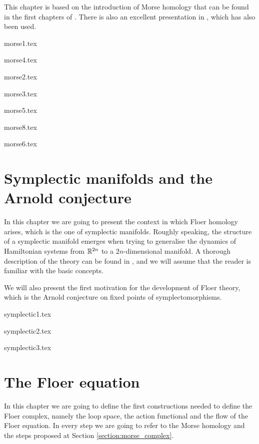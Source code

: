 \documentclass[a4paper,11pt]{book}
\begin{document}
This chapter is based on the introduction of Morse homology that can be found in the first chapters of \cite{audin2014morse}. There is also an excellent presentation in \cite{milnor1963morse}, which has also been used.

{morse1.tex}

 {morse4.tex}

 {morse2.tex}

 {morse3.tex}

 {morse5.tex}

{morse8.tex}

 {morse6.tex}

 \chapter{Symplectic manifolds and the Arnold conjecture}
In this chapter we are going to present the context in which Floer homology arises, which is the one of symplectic manifolds. Roughly speaking, the structure of a symplectic manifold emerges when trying to generalise the dynamics of Hamiltonian systems from $\mathbb{R}^{2n}$ to a $2n$-dimensional manifold. A thorough description of the theory can be found in \cite{da2001lectures}, and we will assume that the reader is familiar with the basic concepts.

We will also present the first motivation for the development of Floer theory, which is the Arnold conjecture on fixed points of symplectomorphisms.

{symplectic1.tex}

{symplectic2.tex}

{symplectic3.tex}

 \chapter{The Floer equation}
 In this chapter we are going to define the first constructions needed to define the Floer complex, namely the loop space, the action functional and the flow of the Floer equation. In every step we are going to refer to the Morse homology and the steps proposed at Section \ref{section:morse_complex}.
\end{document}
